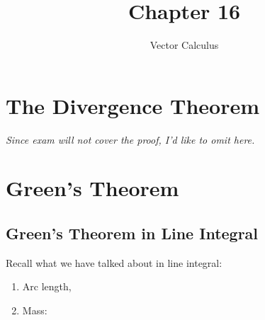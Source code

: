 \documentclass[11pt, a4paper]{MATH2023}
\title{Chapter 16}
\subtitle{Vector Calculus}
\begin{document}
\begin{spacing}{1.3}

    \section{The Divergence Theorem}


    \vspace{0.3in}
    {\it Since exam will not cover the proof, I'd like to omit here.}



    \newpage
    \section{Green's Theorem}
    \subsection{Green's Theorem in Line Integral}

    {\blue Recall what we have talked about in line integral: 
    \begin{enumerate}
        \item Arc length, 
        \item Mass:
    \end{enumerate}
    }


\end{spacing}
\end{document}
